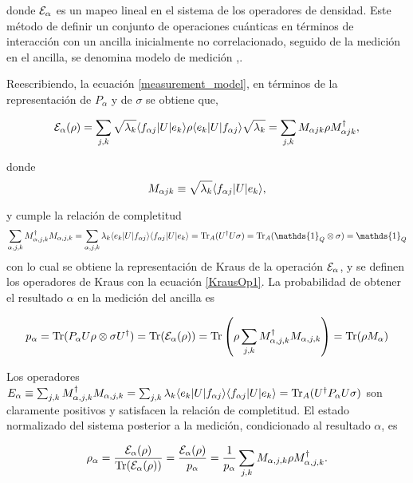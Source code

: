donde $\mathcal{E}_\alpha$ es un mapeo lineal en el sistema de los operadores de densidad. Este método de definir un conjunto de operaciones cuánticas en términos de interacción con un ancilla inicialmente no correlacionado, seguido de la medición en el ancilla, se denomina modelo de medición {\cite{unm2014},\cite{nielsen_chuang_2010}}.

Reescribiendo, la ecuación {\ref{measurement_model}}, en términos de la representación de $P_\alpha$ y de $\sigma$ se obtiene que,

\begin{equation}
    \mathcal{E}_\alpha(\rho)=\sum_{j,k}\sqrt{\lambda_k}\langle f_{\alpha j}|U|e_k\rangle \rho \langle e_k|U|f_{\alpha j}\rangle \sqrt{\lambda_k}=\sum_{j,k}M_{\alpha j k}\rho M_ {\alpha j k}^\dagger,
\end{equation}

donde \begin{equation} \label{KrausOp1}
    M_{\alpha j k}\equiv \sqrt{\lambda_k}\langle f_{\alpha j}|U|e_k\rangle, 
\end{equation}

y cumple la relación de completitud \[\sum_{\alpha, j,k} M_{\alpha,j,k}^\dagger M_{\alpha,j,k}=\sum_{\alpha, j,k} \lambda_k \la e_k|U|f_{\alpha j}\ra \la f_{\alpha j}|U|e_k\ra= \tr_A(U^\dagger U \sigma)=\tr_A(\mathds{1}_Q\otimes\sigma)=\mathds{1}_Q \]
con lo cual se obtiene la representación de Kraus de la operación $\mathcal{E}_\alpha$, y se definen los operadores de Kraus con la ecuación {\ref{KrausOp1}}. La probabilidad de obtener el resultado $\alpha$ en la medición del ancilla es {\cite{unm2014}}

\begin{equation}
    p_\alpha={\rm Tr}(P_\alpha U\rho\otimes\sigma U^\dagger)={\rm Tr}(\mathcal{E}_\alpha(\rho))={\rm Tr}\left(\rho \sum _{j,k} M_{\alpha, j,k}^\dagger M_{\alpha,j,k}\right)={\rm Tr}(\rho M_\alpha)
\end{equation}


Los operadores $E_\alpha \equiv \sum _{j,k} M_{\alpha, j,k}^\dagger M_{\alpha,j,k}=\sum_{j,k} \lambda_k \langle e_k|U|f_{\alpha j}\rangle \langle f_{\alpha j}|U|e_k\rangle={\rm Tr}_A(U^\dagger P_\alpha U\sigma) $ son claramente positivos y satisfacen la relación de completitud. El estado normalizado del sistema posterior a la medición, condicionado al resultado $\alpha$, es {\cite{unm2014}}

\begin{equation}
    \rho_\alpha =\dfrac{\mathcal{E}_\alpha (\rho)}{{\rm Tr}(\mathcal{E}_\alpha(\rho))}=\dfrac{\mathcal{E}_\alpha(\rho)}{p_\alpha}=\dfrac{1}{p_\alpha}\sum_{j,k}M_{\alpha,j,k}\rho M_{\alpha,j,k}^\dagger.
\end{equation}

